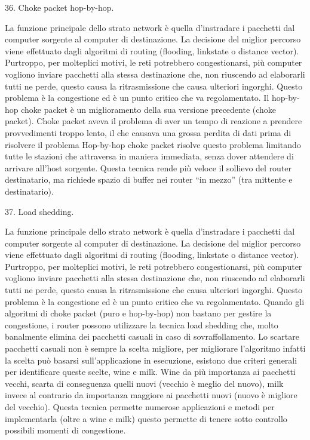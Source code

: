 36.	Choke packet hop-by-hop.

La funzione principale dello strato network è quella d’instradare i pacchetti dal computer sorgente al computer di destinazione. La decisione del miglior percorso viene effettuato dagli algoritmi di routing (flooding, linkstate o distance vector). Purtroppo, per molteplici motivi, le reti potrebbero congestionarsi, più computer vogliono inviare pacchetti alla stessa destinazione che, non riuscendo ad elaborarli tutti ne perde, questo causa la ritrasmissione che causa ulteriori ingorghi. Questo problema è la congestione ed è un punto critico che va regolamentato.
Il hop-by-hop choke packet è un miglioramento della sua versione precedente (choke packet).
Choke packet aveva il problema di aver un tempo di reazione a prendere provvedimenti troppo lento, il che causava una grossa perdita di dati prima di risolvere il problema
Hop-by-hop choke packet risolve questo problema limitando tutte le stazioni che attraversa in maniera immediata, senza dover attendere di arrivare all’host sorgente.
Questa tecnica rende più veloce il sollievo del router destinatario, ma richiede spazio di buffer nei router “in mezzo” (tra mittente e destinatario).
 




37.	Load shedding.

La funzione principale dello strato network è quella d’instradare i pacchetti dal computer sorgente al computer di destinazione. La decisione del miglior percorso viene effettuato dagli algoritmi di routing (flooding, linkstate o distance vector). Purtroppo, per molteplici motivi, le reti potrebbero congestionarsi, più computer vogliono inviare pacchetti alla stessa destinazione che, non riuscendo ad elaborarli tutti ne perde, questo causa la ritrasmissione che causa ulteriori ingorghi. Questo problema è la congestione ed è un punto critico che va regolamentato.
Quando gli algoritmi di choke packet (puro e hop-by-hop) non bastano per gestire la congestione, i router possono utilizzare la tecnica load shedding che, molto banalmente elimina dei pacchetti casuali in caso di sovraffollamento.
Lo scartare pacchetti casuali non è sempre la scelta migliore, per migliorare l’algoritmo infatti la scelta può basarsi sull’applicazione in esecuzione, esistono due criteri generali per identificare queste scelte, wine e milk.
Wine da più importanza ai pacchetti vecchi, scarta di conseguenza quelli nuovi (vecchio è meglio del nuovo), milk invece al contrario da importanza maggiore ai pacchetti nuovi (nuovo è migliore del vecchio).
Questa tecnica permette numerose applicazioni e metodi per implementarla (oltre a wine e milk) questo permette di tenere sotto controllo possibili momenti di congestione.

